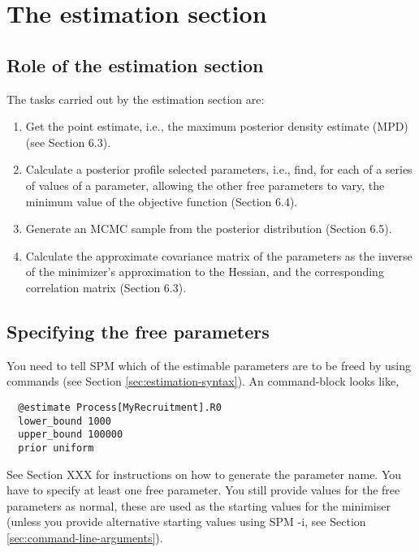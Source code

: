 \section{The estimation section\label{sec:estimation-section}}

\subsection{Role of the estimation section\label{sec:role-of-the-estimation-section}}

The tasks carried out by the estimation section are: 

\begin{enumerate}
\item Get the point estimate, i.e., the maximum posterior density estimate (MPD) (see Section 6.3).

\item Calculate a posterior profile selected parameters, i.e., find, for each of a series of values of a parameter, allowing the other free parameters to vary, the minimum value of the objective function (Section 6.4).

\item Generate an MCMC sample from the posterior distribution (Section 6.5).

\item Calculate the approximate covariance matrix of the parameters as the inverse of the minimizer\textquoteright{}s approximation to the Hessian, and the corresponding correlation matrix (Section 6.3).
\end{enumerate}

\subsection{Specifying the free parameters}

You need to tell SPM which of the estimable parameters are to be freed by using  commands (see Section \ref{sec:estimation-syntax}). An  command-block looks like,

\begin{verbatim}
  @estimate Process[MyRecruitment].R0
  lower_bound 1000
  upper_bound 100000
  prior uniform
\end{verbatim}

See Section XXX for instructions on how to generate the parameter name. You have to specify at least one free parameter. You still provide values for the free parameters as normal, these are used as the starting values for the minimiser (unless you provide alternative starting values using SPM -i, see Section \ref{sec:command-line-arguments}).

